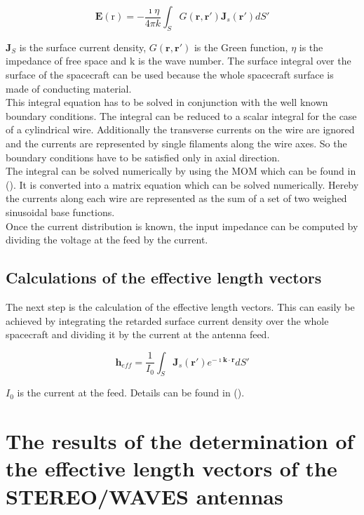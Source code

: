 \documentclass[galley,ras]{agu2001}
\begin{document}
\begin{article}
\begin{equation}\label{EFIE}
    \mathbf{E}(\mathrm{r}) = -\frac{\imath \eta}{4 \pi k} \int_S G(\mathbf{r},\mathbf{r}') \mathbf{J}_s (\mathbf{r}') dS'
\end{equation}


$\mathbf{J}_S$ is the surface current density, $G(\mathbf{r},\mathbf{r}')$ is the Green function, $\eta$ is the impedance of free space and k is the wave number. The surface integral over the surface of the spacecraft can be used because the whole spacecraft surface is made of conducting material.\\

This integral equation has to be solved in conjunction with the well known boundary conditions. The integral can be reduced to a scalar integral for the case of a cylindrical wire. Additionally the transverse currents on the wire are ignored and the currents are represented by single filaments along the wire axes. So the boundary conditions have to be satisfied only in axial direction.\\

The integral can be solved numerically by using the MOM which can be found in (\cite{harrington}). It is converted into a matrix equation which can be solved numerically. Hereby the currents along each wire are represented as the sum of a set of two weighed sinusoidal base functions.\\

Once the current distribution is known, the input impedance can be computed by dividing the voltage at the feed by the current.


\subsection{Calculations of the effective length vectors}
The next step is the calculation of the effective length vectors. This can easily be achieved by integrating the retarded surface current density over the whole spacecraft and dividing it by the current at the antenna feed.

\begin{equation}\label{get_heff}
    \mathbf{h}_{eff} = \frac{1}{I_0} \int_S \mathbf{J}_s (\mathbf{r}') e^{- \imath \mathbf{k} \cdot \mathbf{r}}dS'
\end{equation}

$I_0$ is the current at the feed. Details can be found in (\cite{macher_dipl}).

\section{The results of the determination of the effective length vectors of the STEREO/WAVES antennas}

\end{article}
\end{document}
